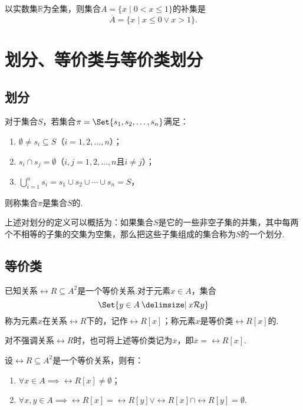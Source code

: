 \begin{example}
以实数集\(\mathbb{R}\)为全集，则集合\(A = \{ x \mid 0 < x \leqslant 1 \}\)的补集是\[
\overline{A} = \{ x \mid x \leqslant 0 \lor x > 1 \}.
\]
\end{example}

\section{划分、等价类与等价类划分}
\subsection{划分}
\begin{definition}
对于集合\(S\)，若集合\(\pi = \Set{ s_1,s_2,\dotsc,s_n }\)满足：
\begin{enumerate}
 \item \(\emptyset \neq s_i \subseteq S\)（\(i=1,2,\dotsc,n\)）；
 \item \(s_i \cap s_j = \emptyset\)（\(i,j=1,2,\dotsc,n\)且\(i \neq j\)）；
 \item \(\bigcup\limits_{i=1}^n s_i = s_1 \cup s_2 \cup \dotsb \cup s_n = S\)，%
\end{enumerate}
则称集合\(\pi\)是集合\(S\)的.
\end{definition}
上述对划分的定义可以概括为：如果集合\(S\)是它的一些非空子集的并集，其中每两个不相等的子集的交集为空集，那么把这些子集组成的集合称为\(S\)的一个划分.


\subsection{等价类}
\begin{definition}
\def\R{\rel{R}}
已知关系\(\R \subseteq A^2\)是一个等价关系.对于元素\(x \in A\)，集合\[
\Set{y \in A \given x \R y}
\]称为元素\(x\)在关系\(\R\)下的，记作\(\R[x]\)；称元素\(x\)是等价类\(\R[x]\)的.

对不强调关系\(\R\)时，也可将上述等价类记为\(\overline{x}\)，即\(\overline{x} = \R[x]\).
\end{definition}

\begin{property}
\def\R{\rel{R}}
设\(\R \subseteq A^2\)是一个等价关系，则有：
\begin{enumerate}
 \item \(\forall x \in A \implies \R[x] \neq \emptyset\)；
 \item \(\forall x,y \in A \implies \R[x] = \R[y] \lor \R[x] \cap \R[y] = \emptyset\).
\end{enumerate}
\end{property}

